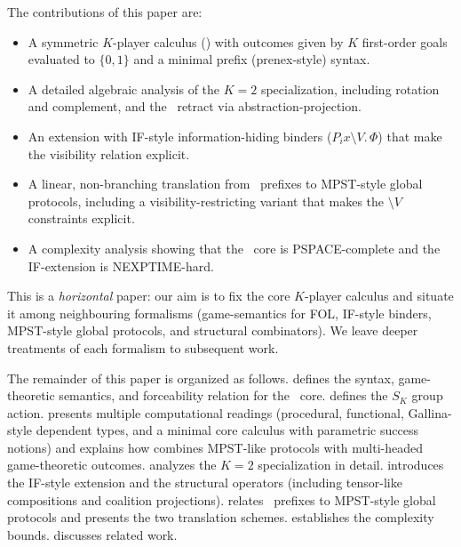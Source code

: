 The contributions of this paper are:
\begin{itemize}
  \item A symmetric $K$-player calculus (\KFOL) with outcomes given by
        $K$ first-order goals evaluated to $\{0,1\}$ and a minimal prefix
        (prenex-style) syntax.
  \item A detailed algebraic analysis of the $K=2$ specialization,
        including rotation and complement, and the \FOL\ retract via
        abstraction-projection.
  \item An extension with IF-style information-hiding binders
        ($P_i x \setminus V.\,\Phi$) that make the visibility relation explicit.
  \item A linear, non-branching translation from \KFOL\ prefixes to
        MPST-style global protocols, including a visibility-restricting
        variant that makes the $\setminus V$ constraints explicit.
  \item A complexity analysis showing that the \KFOL\ core is
        PSPACE-complete and the IF-extension is NEXPTIME-hard.
\end{itemize}

This is a \emph{horizontal} paper: our aim is to fix the core $K$-player calculus and situate it among neighbouring formalisms (game-semantics for FOL, IF-style binders, MPST-style global protocols, and structural combinators). We leave deeper treatments of each formalism to subsequent work.

The remainder of this paper is organized as follows.
 defines the syntax, game-theoretic semantics,
and forceability relation for the \KFOL\ core.
 defines the $S_K$ group action.
 presents multiple computational readings (procedural, functional, 
Gallina-style dependent types, and a minimal core calculus with parametric 
success notions) and explains how \KFOL combines MPST-like protocols with 
multi-headed game-theoretic outcomes.
 analyzes the $K=2$ specialization in detail.
 introduces the IF-style extension and the structural
operators (including tensor-like compositions and coalition projections).
 relates \KFOL\ prefixes to MPST-style global
protocols and presents the two translation schemes.
 establishes the complexity bounds.
 discusses related work.
